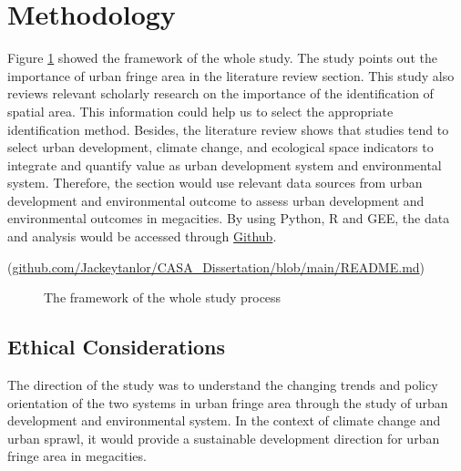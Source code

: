 \section{Methodology} 
Figure \ref{structure} showed the framework of the whole study. The study points out the importance of urban fringe area in the literature review section. This study also reviews relevant scholarly research on the importance of the identification of spatial area. This information could help us to select the appropriate identification method. Besides, the literature review shows that studies tend to select urban development, climate change, and ecological space indicators to integrate and quantify value as urban development system and environmental system. Therefore, the section would use relevant data sources from urban development and environmental outcome to assess urban development and environmental outcomes in megacities. By using Python, R and GEE, the data and analysis would be accessed through \href{https://github.com/Jackeytanlor/CASA_Dissertation/blob/main/README.md}{Github}. 

(\url{github.com/Jackeytanlor/CASA_Dissertation/blob/main/README.md})\\
\begin{figure}[h]
\centering
{}
\caption{The framework of the whole study process}
\label{structure}
\end{figure}

\subsection{Ethical Considerations}
The direction of the study was to understand the changing trends and policy orientation of the two systems in urban fringe area through the study of urban development and environmental system. In the context of climate change and urban sprawl, it would provide a sustainable development direction for urban fringe area in megacities.\\

